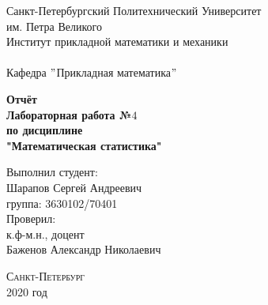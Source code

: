 \documentclass[a4]{article}
\begin{document}
	\def\contentsname{\LARGE{Содержание}}
	\thispagestyle{empty}
	\begin{center} 
		\vspace{2cm} 
		{\Large \sc Санкт-Петербургский Политехнический Университет}\\
		\vspace{2mm}
		{\Large\sc им. Петра Великого}\\
		\vspace{1cm}
		{\large \sc Институт прикладной математики и механики\\ 
			\vspace{0.5mm}
			\textsc{}}\\ 
		\vspace{0.5mm}
		{\large\sc Кафедра $"$Прикладная математика$"$}\\
		\vspace{15mm}
		
		
		{\sc \textbf{Отчёт\\
			Лабораторная работа №$4$\\
			по дисциплине\\
			"Математическая статистика"}
			\vspace{6mm}
			
		}
		\vspace*{2mm}
		
		
		\begin{flushleft}
			\vspace{4cm}
			\sc Выполнил студент:\\
			\sc Шарапов Сергей Андреевич\\
			\sc группа: 3630102/70401\\
			\vspace{1cm}
			\sc Проверил:\\
			\sc к.ф-м.н., доцент\\
			\sc Баженов Александр Николаевич
			\vspace{20mm}
		\end{flushleft}
	\end{center} 
	\begin{center}
		\vfill {\large\textsc{Санкт-Петербург}}\\ 
		2020 год
	\end{center}
	
	\newpage
	\pagestyle{plain}
	
	
	
\end{document}
